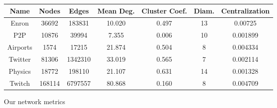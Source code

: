 \documentclass{article}
\begin{document}
\begin{figure}[h]
	\centering
	\begin{tabular}{|c|c|c|c|c|c|c|}
		\hline
		\textbf{Name} & \textbf{Nodes} & \textbf{Edges} & \textbf{Mean Deg.} & \textbf{Cluster Coef.} & \textbf{Diam.} & \textbf{Centralization} \\
		\hline
		Enron         & 36692          & 183831         & 10.020             & 0.497                  & 13             & 0.00725                 \\
		P2P           & 10876          & 39994          & 7.355              & 0.006                  & 10             & 0.001899                \\
		Airports      & 1574           & 17215          & 21.874             & 0.504                  & 8              & 0.004334                \\
		Twitter       & 81306          & 1342310        & 33.019             & 0.565                  & 7              & 0.002114                \\
		Physics       & 18772          & 198110         & 21.107             & 0.631                  & 14             & 0.001328                \\
		Twitch        & 168114         & 6797557        & 80.868             & 0.160                  & 8              & 0.004709                \\
		\hline
	\end{tabular}
	\caption{Our network metrics}
	\label{networks-table-stats}
\end{figure}
\end{document}
